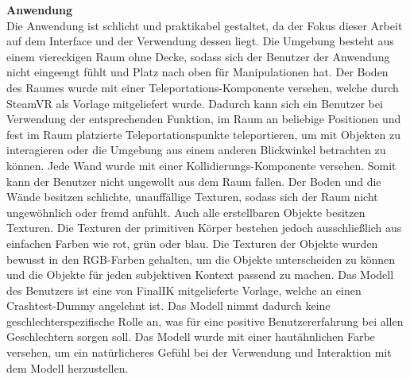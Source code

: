 \noindent \textbf{Anwendung}\\
Die Anwendung ist schlicht und praktikabel gestaltet, da der Fokus dieser Arbeit auf dem Interface und der Verwendung dessen liegt. Die Umgebung besteht aus einem viereckigen Raum ohne Decke, sodass sich der Benutzer der Anwendung nicht eingeengt fühlt und Platz nach oben für Manipulationen hat. Der Boden des Raumes wurde mit einer Teleportations-Komponente versehen, welche durch SteamVR als Vorlage mitgeliefert wurde. Dadurch kann sich ein Benutzer bei Verwendung der entsprechenden Funktion, im Raum an beliebige Positionen und fest im Raum platzierte Teleportationspunkte teleportieren, um mit Objekten zu interagieren oder die Umgebung aus einem anderen Blickwinkel betrachten zu können. Jede Wand wurde mit einer Kollidierungs-Komponente versehen. Somit kann der Benutzer nicht ungewollt aus dem Raum fallen. Der Boden und die Wände besitzen schlichte, unauffällige Texturen, sodass sich der Raum nicht ungewöhnlich oder fremd anfühlt. Auch alle erstellbaren Objekte besitzen Texturen. Die Texturen der primitiven Körper bestehen jedoch ausschließlich aus einfachen Farben wie rot, grün oder blau. Die Texturen der Objekte wurden bewusst in den RGB-Farben gehalten, um die Objekte unterscheiden zu können und die Objekte für jeden subjektiven Kontext passend zu machen. Das Modell des Benutzers ist eine von FinalIK mitgelieferte Vorlage, welche an einen Crashtest-Dummy angelehnt ist. Das Modell nimmt dadurch keine geschlechterspezifische Rolle an, was für eine positive Benutzererfahrung bei allen Geschlechtern sorgen soll. Das Modell wurde mit einer hautähnlichen Farbe versehen, um ein natürlicheres Gefühl bei der Verwendung und Interaktion mit dem Modell herzustellen.\\

